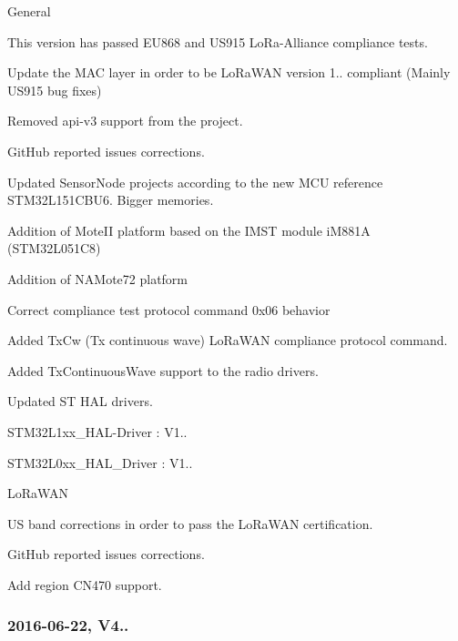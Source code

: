 \begin{DoxyItemize}
\item General
\begin{DoxyEnumerate}
\item This version has passed E\+U868 and U\+S915 Lo\+Ra-\/\+Alliance compliance tests.
\item Update the M\+AC layer in order to be Lo\+Ra\+W\+AN version 1.. compliant (Mainly U\+S915 bug fixes)
\item Removed api-\/v3 support from the project.
\item Git\+Hub reported issues corrections.
\item Updated Sensor\+Node projects according to the new M\+CU reference S\+T\+M32\+L151\+C\+B\+U6. Bigger memories.
\item Addition of Mote\+II platform based on the I\+M\+ST module i\+M881A (S\+T\+M32\+L051\+C8)
\item Addition of N\+A\+Mote72 platform
\item Correct compliance test protocol command 0x06 behavior
\item Added Tx\+Cw (Tx continuous wave) Lo\+Ra\+W\+AN compliance protocol command.
\item Added Tx\+Continuous\+Wave support to the radio drivers.
\item Updated ST H\+AL drivers.
\begin{DoxyItemize}
\item S\+T\+M32\+L1xx\+\_\+\+H\+A\+L-\/\+Driver \+: V1..
\item S\+T\+M32\+L0xx\+\_\+\+H\+A\+L\+\_\+\+Driver \+: V1..
\end{DoxyItemize}
\end{DoxyEnumerate}
\item Lo\+Ra\+W\+AN
\begin{DoxyEnumerate}
\item US band corrections in order to pass the Lo\+Ra\+W\+AN certification.
\item Git\+Hub reported issues corrections.
\item Add region C\+N470 support.
\end{DoxyEnumerate}
\end{DoxyItemize}

\subsubsection*{2016-\/06-\/22, V4..}



